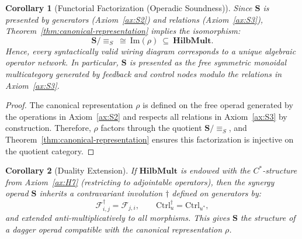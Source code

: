 \documentclass[11pt]{article}
\newtheorem{corollary}{Corollary}
\begin{document}
\begin{corollary}[Functorial Factorization (Operadic Soundness)]\label{cor:functorial-factorization}
Since $\mathbf{S}$ is presented by generators (Axiom~\ref{ax:S2}) and relations (Axiom~\ref{ax:S3}), Theorem~\ref{thm:canonical-representation} implies the isomorphism:
\[
\mathbf{S}/{\equiv_S} \ \cong \ \mathrm{Im}(\rho) \ \subseteq \ \mathbf{HilbMult}.
\]
Hence, every syntactically valid wiring diagram corresponds to a unique algebraic operator network. In particular, $\mathbf{S}$ is presented as the free symmetric monoidal multicategory generated by feedback and control nodes modulo the relations in Axiom~\ref{ax:S3}.
\end{corollary}

\begin{proof}
The canonical representation $\rho$ is defined on the free operad generated by the operations in Axiom~\ref{ax:S2} and respects all relations in Axiom~\ref{ax:S3} by construction. Therefore, $\rho$ factors through the quotient $\mathbf{S}/{\equiv_S}$, and Theorem~\ref{thm:canonical-representation} ensures this factorization is injective on the quotient category.
\end{proof}

\begin{corollary}[Duality Extension]\label{cor:duality-extension}
If $\mathbf{HilbMult}$ is endowed with the $C^*$-structure from Axiom~\ref{ax:H7} (restricting to adjointable operators), then the synergy operad $\mathbf{S}$ inherits a contravariant involution $\dagger$ defined on generators by:
\[
\mathcal{F}_{i,j}^\dagger = \mathcal{F}_{j,i}, \qquad \mathrm{Ctrl}_u^\dagger = \mathrm{Ctrl}_{u^*},
\]
and extended anti-multiplicatively to all morphisms. This gives $\mathbf{S}$ the structure of a dagger operad compatible with the canonical representation $\rho$.
\end{corollary}
\end{document}
